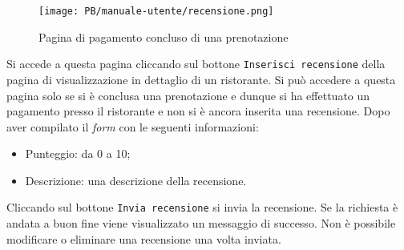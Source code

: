 \begin{figure}[htbp]
    \centering
	\texttt{[image: PB/manuale-utente/recensione.png]}
    \caption{Pagina di pagamento concluso di una prenotazione}
\end{figure}

Si accede a questa pagina cliccando sul bottone \texttt{Inserisci recensione} della
pagina di visualizzazione in dettaglio di un ristorante. Si può accedere a
questa pagina solo se si è conclusa una prenotazione e dunque si ha effettuato un pagamento presso il ristorante e non
si è ancora inserita una recensione. Dopo aver compilato il \textit{form} con le seguenti
informazioni:
\begin{itemize}
	\item Punteggio: da 0 a 10;
	\item Descrizione: una descrizione della recensione.
\end{itemize}

Cliccando sul bottone \texttt{Invia recensione} si invia la recensione. Se la
richiesta è andata a buon fine viene visualizzato un messaggio di successo. Non
è possibile modificare o eliminare una recensione una volta inviata.
